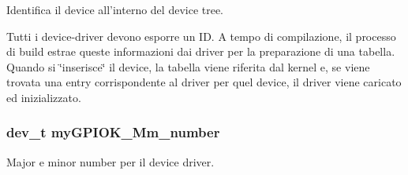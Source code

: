 Identifica il device all'interno del device tree. 

Tutti i device-\/driver devono esporre un I\+D. A tempo di compilazione, il processo di build estrae queste informazioni dai driver per la preparazione di una tabella. Quando si \char`\"{}inserisce\char`\"{} il device, la tabella viene riferita dal kernel e, se viene trovata una entry corrispondente al driver per quel device, il driver viene caricato ed inizializzato. \hypertarget{group___kernel-_module_ga434e034e4625b1949f0c626823870a39}{
\subsubsection[{my\+G\+P\+I\+O\+K\+\_\+\+Mm\+\_\+number}]{\setlength{\rightskip}{0pt plus 5cm}dev\+\_\+t my\+G\+P\+I\+O\+K\+\_\+\+Mm\+\_\+number\hspace{0.3cm}{\ttfamily [static]}}}\label{group___kernel-_module_ga434e034e4625b1949f0c626823870a39}


Major e minor number per il device driver. 


